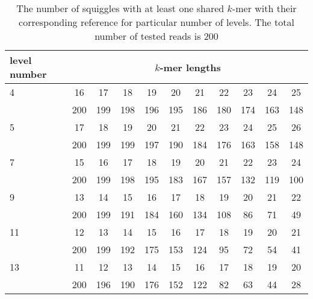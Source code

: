 \begin{table}
\caption[TODO]{The number of squiggles with at least one shared $k$-mer with their
corresponding reference for particular number of levels. The total number of tested
reads is 200}
\label{tab:sharedKmers}
\begin{center}
\begin{tabular}{|l|c|c|c|c|c|c|c|c|c|c|}
\hline
level number & \multicolumn{10}{|c|}{$k$-mer lengths} \\
\hline
4 & 16 & 17 & 18 & 19 & 20 & 21 & 22 & 23 & 24 & 25 \\\cline{2-11}
& 200 & 199 & 198 & 196 & 195 & 186 & 180 & 174 & 163 & 148 \\\cline{2-11}
\hline
5 & 17 & 18 & 19 & 20 & 21 & 22 & 23 & 24 & 25 & 26 \\\cline{2-11}
& 200 & 199 & 199 & 197 & 190 & 184 & 176 & 163 & 158 & 148 \\\cline{2-11}
\hline
7 & 15 & 16 & 17 & 18 & 19 & 20 & 21 & 22 & 23 & 24 \\\cline{2-11}
& 200 & 199 & 198 & 195 & 183 & 167 & 157 & 132 & 119 & 100 \\\cline{2-11}
\hline
9 & 13 & 14 & 15 & 16 & 17 & 18 & 19 & 20 & 21 & 22 \\\cline{2-11}
& 200 & 199 & 191 & 184 & 160 & 134 & 108 & 86 & 71 & 49 \\\cline{2-11}
\hline
11 & 12 & 13 & 14 & 15 & 16 & 17 & 18 & 19 & 20 & 21 \\\cline{2-11}
& 200 & 199 & 192 & 175 & 153 & 124 & 95 & 72 & 54 & 41 \\\cline{2-11}
\hline
13 & 11 & 12 & 13 & 14 & 15 & 16 & 17 & 18 & 19 & 20 \\\cline{2-11}
& 200 & 196 & 190 & 176 & 152 & 122 & 82 & 63 & 44 & 28 \\\cline{2-11}
\hline
\end{tabular}
\end{center}
\end{table}

